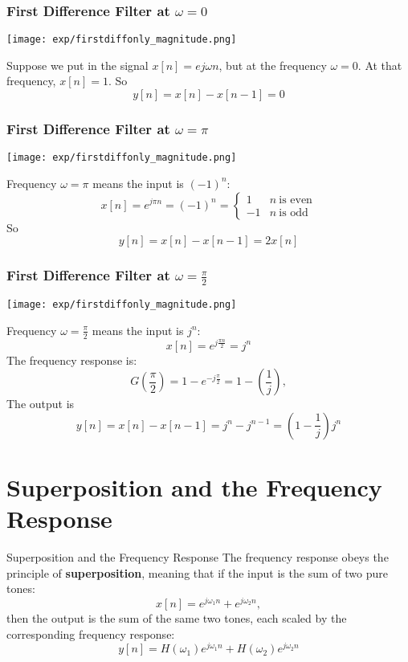 \documentclass{beamer}
\begin{document}
\begin{frame}
  \frametitle{First Difference Filter at $\omega=0$}

  \centerline{\texttt{[image: exp/firstdiffonly\_magnitude.png]}}

  Suppose we put in the signal $x[n]=e{j\omega n}$, but at the frequency $\omega=0$.
  At that frequency, $x[n]=1$.  So
  \[
  y[n] = x[n]-x[n-1] = 0
  \]
\end{frame}


\begin{frame}
  \frametitle{First Difference Filter at $\omega=\pi$}
  \centerline{\texttt{[image: exp/firstdiffonly\_magnitude.png]}}
  Frequency $\omega=\pi$ means the input is $(-1)^n$:
  \[
  x[n] = e^{j\pi n} = (-1)^n= \begin{cases}
    1 & n~\mbox{is even}\\
    -1 & n~\mbox{is odd}
  \end{cases}
  \]
  So
  \[
  y[n]=x[n]-x[n-1] = 2x[n]
  \]
\end{frame}

\begin{frame}
  \frametitle{First Difference Filter at $\omega=\frac{\pi}{2}$}
  \centerline{\texttt{[image: exp/firstdiffonly\_magnitude.png]}}
  Frequency $\omega=\frac{\pi}{2}$ means the input is $j^n$:
  \[
  x[n] = e^{j\frac{\pi n}{2}} = j^n
  \]
  The frequency response is:
  \[
  G\left(\frac{\pi}{2}\right) = 1-e^{-j\frac{\pi}{2}} = 1 - \left(\frac{1}{j}\right),
  \]
  The output is
  \[
  y[n] = x[n]-x[n-1] = j^n - j^{n-1} = \left(1-\frac{1}{j}\right)j^n
  \]
\end{frame}

\section[Superposition]{Superposition and the Frequency Response}
\setcounter{subsection}{1}

\begin{frame}
  \begin{block}{Superposition and the Frequency Response}
    The frequency response obeys the principle of {\bf superposition}, meaning that
    if the input is the sum of two pure tones:
    \[
    x[n] = e^{j\omega_1 n} + e^{j\omega_2 n},
    \]
    then the output is the sum of the same two tones, each scaled by
    the corresponding frequency response:
    \[
    y[n] = H(\omega_1)e^{j\omega_1 n}+H(\omega_2)e^{j\omega_2 n}
    \]
  \end{block}
\end{frame}
\end{document}
